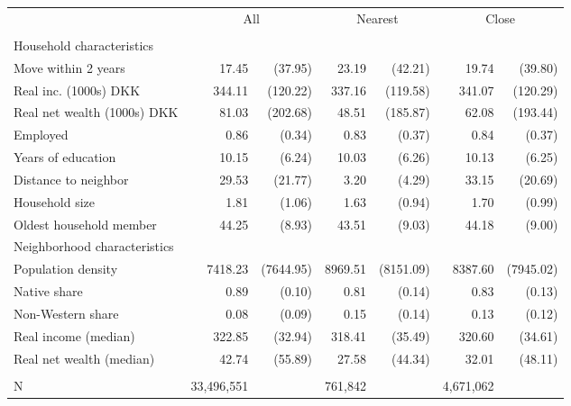 \begin{tabular}{lrrrrrr}
\toprule
 & \multicolumn{2}{c}{All} & \multicolumn{2}{c}{Nearest} & \multicolumn{2}{c}{Close} \\ 
\cmidrule(lr){2-3} \cmidrule(lr){4-5} \cmidrule(lr){6-7}
 &  &  &  &  &  &  \\ 
\midrule
\multicolumn{7}{l}{Household characteristics} \\ 
\midrule
Move within 2 years & 17.45 & (37.95) & 23.19 & (42.21) & 19.74 & (39.80) \\ 
Real inc. (1000s) DKK & 344.11 & (120.22) & 337.16 & (119.58) & 341.07 & (120.29) \\ 
Real net wealth (1000s) DKK & 81.03 & (202.68) & 48.51 & (185.87) & 62.08 & (193.44) \\ 
Employed & 0.86 & (0.34) & 0.83 & (0.37) & 0.84 & (0.37) \\ 
Years of education & 10.15 & (6.24) & 10.03 & (6.26) & 10.13 & (6.25) \\ 
Distance to neighbor & 29.53 & (21.77) & 3.20 & (4.29) & 33.15 & (20.69) \\ 
Household size & 1.81 & (1.06) & 1.63 & (0.94) & 1.70 & (0.99) \\ 
Oldest household member & 44.25 & (8.93) & 43.51 & (9.03) & 44.18 & (9.00) \\ 
\midrule
\multicolumn{7}{l}{Neighborhood characteristics} \\ 
\midrule
Population density & 7418.23 & (7644.95) & 8969.51 & (8151.09) & 8387.60 & (7945.02) \\ 
Native share & 0.89 & (0.10) & 0.81 & (0.14) & 0.83 & (0.13) \\ 
Non-Western share & 0.08 & (0.09) & 0.15 & (0.14) & 0.13 & (0.12) \\ 
Real income (median) & 322.85 & (32.94) & 318.41 & (35.49) & 320.60 & (34.61) \\ 
Real net wealth (median) & 42.74 & (55.89) & 27.58 & (44.34) & 32.01 & (48.11) \\ 
\midrule
\multicolumn{7}{l}{\vspace*{-5mm}} \\ 
N & 33,496,551 &  & 761,842 &  & 4,671,062 &  \\ 
\bottomrule
\end{tabular}